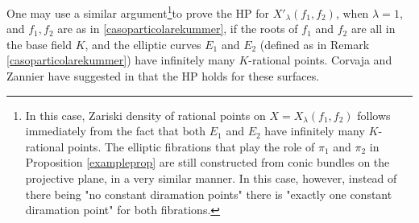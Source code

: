 \documentclass[a4paper,12pt]{article}
\begin{document}
\begin{remark}
	One may use a similar argument\footnote{In this case, Zariski density of rational points on $X=X_{\lambda}(f_1,f_2)$ follows immediately from the fact that both $E_1$ and $E_2$ have infinitely many $K$-rational points. The elliptic fibrations that play the role of $\pi_1$ and $\pi_2$ in Proposition \ref{exampleprop} are still constructed from conic bundles on the projective plane, in a very similar manner. In this case, however, instead of there being "no constant diramation points" there is "exactly one constant diramation point" for both fibrations.}to prove the HP for $X'_{\lambda}(f_1,f_2)$, when $\lambda=1$, and $f_1, f_2$ are as in \ref{casoparticolarekummer}, if the roots of $f_1$ and $f_2$ are all in the base field $K$, and the elliptic curves $E_1$ and $E_2$ (defined as in Remark \ref{casoparticolarekummer}) have infinitely many $K$-rational points. Corvaja and Zannier have suggested in \cite{articoloHP} that the HP holds for these surfaces.
\end{remark}


\end{document}
